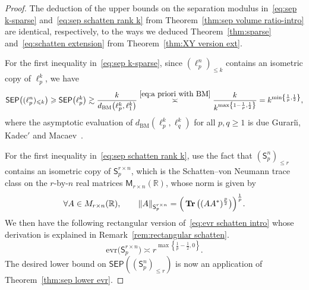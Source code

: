 \documentclass[11pt,reqno]{amsart}
\renewcommand{\le}{\leqslant}
\renewcommand{\ge}{\geqslant}
\def\cprime{$'$}
\newcommand{\evr}{\mathrm{evr}}
\newcommand{\R}{\mathbb R}
\theoremstyle{remark}
\newcommand{\M}{\mathsf{M}}
\newcommand{\sfS}{\mathsf{S}}
\DeclareMathOperator{\trace}{\bf Tr}
\newcommand{\BM}{\mathrm{BM}}
\renewcommand{\1}{\mathbf 1}
\newcommand{\sep}{\mathsf{SEP}}
\def\cprime{$'$}
\begin{document}
\begin{proof} The deduction of the upper bounds on the separation modulus in~\eqref{eq:sep k-sparse} and~\eqref{eq:sep schatten rank k} from Theorem~\ref{thm:sep volume ratio-intro} are identical, respectively, to the ways we deduced Theorem~\ref{thm:sparse}  and~\eqref{eq:schatten extension} from   Theorem~\ref{thm:XY version ext}.

For the first inequality in~\eqref{eq:sep k-sparse},  since $(\ell_p^n)_{\le k}$ contains an isometric copy of $\ell_p^k$, we have
$$
\sep\big((\ell_p^n)_{\le k}\big)\ge \sep\big(\ell_p^k\big)\gtrsim \frac{k}{d_{\BM}\big(\ell_p^k,\ell_1^k\big)}\stackrel{\eqref{eq:a priori with BM}}{\asymp} \frac{k}{k^{\max\left\{1-\frac{1}{p},\frac12\right\}}}=k^{\min\left\{\frac{1}{p},\frac12\right\}},
$$
where the asymptotic evaluation of $d_{\BM}(\ell_p^k,\ell_q^k)$ for all $p,q\ge 1$ is due  Gurari{\u\i}, Kadec{\cprime} and Macaev~\cite{GKM66}.

For the first inequality in~\eqref{eq:sep schatten rank k}, use the fact that $(\sfS_p^{n})_{\le r}$ contains an isometric copy of $\sfS_p^{r\times n}$, which is the Schatten--von Neumann trace class on the $r$-by-$n$ real matrices $\M_{r\times n}(\R)$, whose norm is given by
\begin{equation}\label{eq:def schatten rectangular}
\forall A\in M_{r\times n}(\R),\qquad \|A\|_{\sfS_p^{r\times n}}= \Big(\trace \big((AA^*)^{\frac{p}{2}}\big)\Big)^{\frac{1}{p}}.
\end{equation}
We then have the following rectangular version of~\eqref{eq:evr schatten intro} whose derivation is explained in Remark~\ref{rem:rectangular schatten}.
\begin{equation}\label{eq:evr rectangular k}
\evr\big(\sfS^{r\times n}_p\big)\asymp r^{\max\left\{\frac{1}{p}-\frac12,0\right\}}.
\end{equation}
The desired lower bound on $\sep((\sfS_p^{n})_{\le r})$ is now an application of Theorem~\ref{thm:sep lower evr}.
\end{proof}
\end{document}
